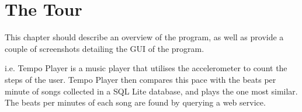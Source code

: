 \section{The Tour}
This chapter should describe an overview of the program, as well as provide a couple of screenshots detailing the GUI of the program.

i.e. Tempo Player is a music player that utilises the accelerometer to count the steps of the user. 
Tempo Player then compares this pace with the beats per minute of songs collected in a SQL Lite database, and plays the one most similar. 
The beats per minutes of each song are found by querying a web service. 

